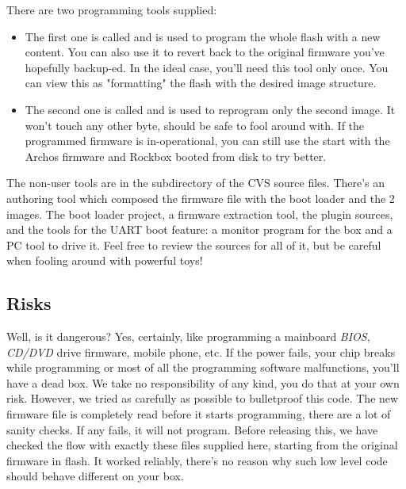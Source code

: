 
There are two programming tools supplied:

\begin{itemize}
\item The first one is called  and is used to 
  program the whole flash with a new content. You can also use it to revert 
  back to the original firmware you've hopefully backup-ed. In the ideal case, 
  you'll need this tool only once. You can view this as "formatting" the flash 
  with the desired image structure.
\item The second one is called  and is used to 
  reprogram only the second image. It won't touch any other byte, should be 
  safe to fool around with. If the programmed firmware is in-operational, you 
  can still use the  start with the Archos firmware and Rockbox booted
  from disk to try better.
\end{itemize}

The non-user tools are in the  subdirectory of the CVS source 
files. There's an authoring tool which composed the firmware file with the 
boot loader and the 2 images. The boot loader project, a firmware extraction 
tool, the plugin sources, and the tools for the UART boot feature: a monitor 
program for the box and a PC tool to drive it. Feel free to review the sources 
for all of it, but be careful when fooling around with powerful toys!

\subsection{Risks}
Well, is it dangerous? Yes, certainly, like programming a mainboard 
\emph{BIOS}, \emph{CD/DVD} drive firmware, mobile phone, etc. If the power 
fails, your chip breaks while programming or most of all the programming 
software malfunctions, you'll have a dead box. We take no responsibility of any
kind, you do that at your own risk. However, we tried as carefully as possible 
to bulletproof this code. The new firmware file is completely read before it 
starts programming, there are a lot of sanity checks. If any fails, it will not
program. Before releasing this, we have checked the flow with exactly these 
files supplied here, starting from the original firmware in flash. It worked 
reliably, there's no reason why such low level code should behave different on 
your box.

